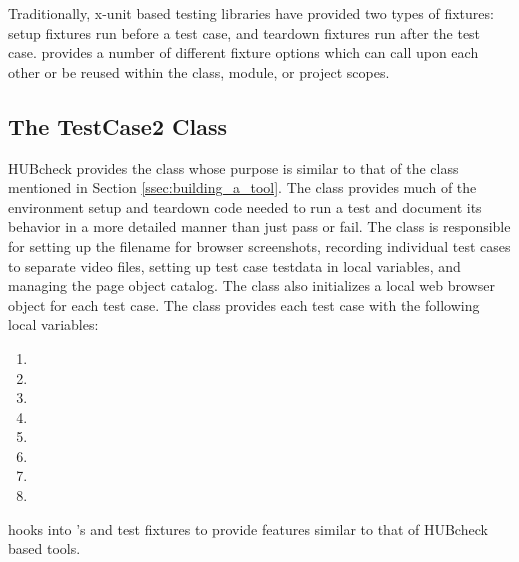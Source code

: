 
Traditionally, x-unit \cite{Xunit:Online} based testing libraries have provided
two types of fixtures: setup fixtures run before a test case, and teardown
fixtures run after the test case.  provides a number of
different fixture options which can call upon each other or be reused within
the class, module, or project scopes.


\subsection{The TestCase2 Class}
\label{ssec:hubcheck_tests_testcase2}

HUBcheck provides the  class whose purpose is similar to that
of the  class mentioned in Section \ref{ssec:building_a_tool}.
The  class provides much of the environment setup and
teardown code needed to run a test and document its behavior in a more detailed
manner than just pass or fail.  The  class is responsible for
setting up the filename for browser screenshots, recording individual test
cases to separate video files, setting up test case testdata in local
variables, and managing the page object catalog.  The class also initializes a
local web browser object for each test case.  The  class
provides each test case with the following local variables:

\begin{enumerate}
\item {}
\item {}
\item {}
\item {}
\item {}
\item {}
\item {}
\item {}
\end{enumerate}

 hooks into 's  and
 test fixtures to provide features similar to that
of HUBcheck based tools.

